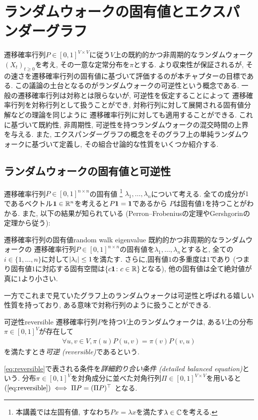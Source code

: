 \chapter{ランダムウォークの固有値とエクスパンダーグラフ}
遷移確率行列$P \in [0,1]^{V \times V}$に従う$V$上の既約的かつ非周期的なランダムウォーク$(X_t)_{t\ge 0}$を考え,
その一意な定常分布を$\pi$とする.
より収束性が保証されるが, その速さを遷移確率行列の固有値に基づいて評価するのが本チャプターの目標である.
この議論の土台となるのがランダムウォークの可逆性という概念である.
一般の遷移確率行列は対称とは限らないが, 可逆性を仮定することによって
遷移確率行列を対称行列として扱うことができ,
対称行列に対して展開される固有値分解などの理論を同じように
遷移確率行列に対しても適用することができる.
これに基づいて既約性, 非周期性, 可逆性を持つランダムウォークの混交時間の上界を与える.
また, エクスパンダーグラフの概念をそのグラフ上の単純ランダムウォークに基づいて定義し,
その組合せ論的な性質をいくつか紹介する.

\section{ランダムウォークの固有値と可逆性}
遷移確率行列$P \in [0,1]^{n \times n}$の固有値
\footnote{本講義では左固有値, すなわち$Px=\lambda x$を満たす$\lambda\in \mathbb{C}$を考える.}
$\lambda_1,\dots,\lambda_n$について考える.
全ての成分が$1$であるベクトル$\mathbf{1}\in \mathbb{R}^n$を考えると$P\mathbf{1} = \mathbf{1}$であるから
$P$は固有値$1$を持つことがわかる.
また, 以下の結果が知られている (Perron--Frobeniusの定理やGershgorinの定理から従う):
\begin{lemma}{遷移確率行列の固有値}{random walk eigenvalue}
    既約的かつ非周期的なランダムウォークの
    遷移確率行列$P\in [0,1]^{n\times n}$の固有値を$\lambda_1,\dots,\lambda_n$とすると,
    全ての$i\in\{1,\dots,n\}$に対して$\lvert\lambda_i\rvert \le 1$を満たす.
    さらに,固有値$1$の多重度は$1$であり (つまり固有値$1$に対応する固有空間は$\{c\mathbf{1} \colon c \in \mathbb{R}\}$となる), 他の固有値は全て絶対値が真に$1$より小さい.
\end{lemma}
%

一方でこれまで見ていたグラフ上のランダムウォークは可逆性と呼ばれる嬉しい性質を持っており,
ある意味で対称行列のように扱うことができる.
\begin{definition}{可逆性}{reversible}
    遷移確率行列$P$を持つ$V$上のランダムウォークは,
    ある$V$上の分布$\pi \in [0,1]^V$が存在して
    \begin{align}
        \forall u,v\in V,\pi(u) P(u,v) = \pi(v) P(v,u) \label{eq:reversible}
    \end{align}
    を満たすとき\emph{可逆 (reversible)}であるという.
\end{definition}
\cref{eq:reversible}で表される条件を\emph{詳細釣り合い条件 (detailed balanced equation)}という.
分布$\pi\in [0,1]^V$を対角成分に並べた対角行列$\Pi\in[0,1]^{V\times V}$を用いると
$(\ref{eq:reversible}) \iff \Pi P = (\Pi P)^{\top}$
となる.

